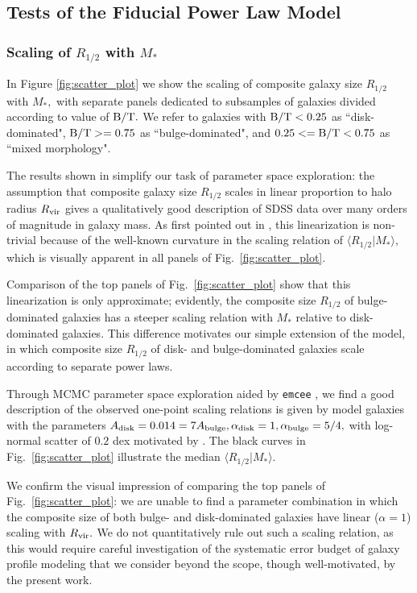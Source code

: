 \documentclass[usenatbib,usegraphicx,letterpaper]{mn2e}
\newcommand{\rhalf}{R_{1/2}}
\newcommand{\adisk}{A_{\rm disk}}
\newcommand{\abulge}{A_{\rm bulge}}
\newcommand{\alphadisk}{\alpha_{\rm disk}}
\newcommand{\alphabulge}{\alpha_{\rm bulge}}
\newcommand{\rvir}{R_{\rm vir}}
\newcommand{\bt}{{\rm B/T}}
\newcommand{\mstar}{M_{\ast}}
\begin{document}
\subsection{Tests of the Fiducial Power Law Model}
\label{subsec:tests1}

\subsubsection{Scaling of $\rhalf$ with $\mstar$}
\label{subsubsec:scaling_relation}

In Figure \ref{fig:scatter_plot} we show the scaling of composite galaxy size $\rhalf$ with $\mstar,$ with separate panels dedicated to subsamples of galaxies divided according to value of $\bt.$ We refer to galaxies with $\bt<0.25$ as ``disk-dominated", $\bt>=0.75$ as ``bulge-dominated", and $0.25<=\bt<0.75$ as ``mixed morphology". 

The results shown in \citet{kravtsov13} simplify our task of parameter space exploration: the assumption that composite galaxy size $\rhalf$ scales in linear proportion to halo radius $\rvir$ gives a qualitatively good description of SDSS data over many orders of magnitude in galaxy mass. As first pointed out in \citet{kravtsov13}, this linearization is non-trivial because of the well-known curvature in the scaling relation of $\langle\rhalf\vert\mstar\rangle,$ which is visually apparent in all panels of Fig.~\ref{fig:scatter_plot}. 

Comparison of the top panels of Fig.~\ref{fig:scatter_plot} show that this linearization is only approximate; evidently, the composite size $\rhalf$ of bulge-dominated galaxies has a steeper scaling relation with $\mstar$ relative to disk-dominated galaxies. This difference motivates our simple extension of the \citet{kravtsov13} model, in which composite size $\rhalf$ of disk- and bulge-dominated galaxies scale according to separate power laws. 

Through MCMC parameter space exploration aided by {\tt emcee} \citep{emcee_hammer}, we find a good description of the observed one-point scaling relations is given by model galaxies with the parameters $\adisk=0.014=7\abulge, \alphadisk=1, \alphabulge=5/4,$ with log-normal scatter of $0.2$ dex motivated by \citet{somerville_etal17}. The black curves in Fig.~\ref{fig:scatter_plot} illustrate the median $\langle\rhalf\vert\mstar\rangle.$ 

We confirm the visual impression of comparing the top panels of Fig.~\ref{fig:scatter_plot}: we are unable to find a parameter combination in which the composite size of both bulge- and disk-dominated galaxies have linear ($\alpha=1$) scaling with $\rvir.$ We do not quantitatively rule out such a scaling relation, as this would require careful investigation of the systematic error budget of galaxy profile modeling that we consider beyond the scope, though well-motivated, by the present work. 
 
\end{document}
